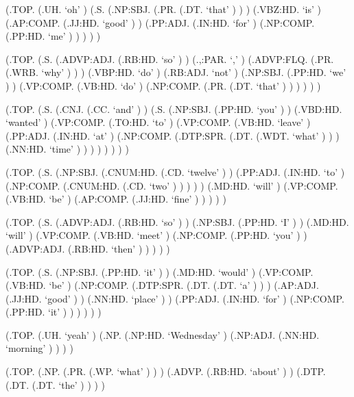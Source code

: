 \documentclass[10pt]{article}
\begin{document}
\begin{parsetree}  (.TOP. (.UH. `oh' ) (.S. (.NP:SBJ. (.PR. (.DT. `that' ) ) ) (.VBZ:HD. `is' ) (.AP:COMP. (.JJ:HD. `good' ) ) (.PP:ADJ. (.IN:HD. `for' ) (.NP:COMP. (.PP:HD. `me' ) ) ) ) ) \end{parsetree}

\begin{parsetree}  (.TOP. (.S. (.ADVP:ADJ. (.RB:HD. `so' ) ) (.,:PAR. `,' ) (.ADVP:FLQ. (.PR. (.WRB. `why' ) ) ) (.VBP:HD. `do' ) (.RB:ADJ. `not' ) (.NP:SBJ. (.PP:HD. `we' ) ) (.VP:COMP. (.VB:HD. `do' ) (.NP:COMP. (.PR. (.DT. `that' ) ) ) ) ) ) \end{parsetree}

\begin{parsetree}  (.TOP. (.S. (.CNJ. (.CC. `and' ) ) (.S. (.NP:SBJ. (.PP:HD. `you' ) ) (.VBD:HD. `wanted' ) (.VP:COMP. (.TO:HD. `to' ) (.VP:COMP. (.VB:HD. `leave' ) (.PP:ADJ. (.IN:HD. `at' ) (.NP:COMP. (.DTP:SPR. (.DT. (.WDT. `what' ) ) ) (.NN:HD. `time' ) ) ) ) ) ) ) ) \end{parsetree}

\begin{parsetree}  (.TOP. (.S. (.NP:SBJ. (.CNUM:HD. (.CD. `twelve' ) ) (.PP:ADJ. (.IN:HD. `to' ) (.NP:COMP. (.CNUM:HD. (.CD. `two' ) ) ) ) ) (.MD:HD. `will' ) (.VP:COMP. (.VB:HD. `be' ) (.AP:COMP. (.JJ:HD. `fine' ) ) ) ) ) \end{parsetree}

\begin{parsetree}  (.TOP. (.S. (.ADVP:ADJ. (.RB:HD. `so' ) ) (.NP:SBJ. (.PP:HD. `I' ) ) (.MD:HD. `will' ) (.VP:COMP. (.VB:HD. `meet' ) (.NP:COMP. (.PP:HD. `you' ) ) (.ADVP:ADJ. (.RB:HD. `then' ) ) ) ) ) \end{parsetree}

\begin{parsetree}  (.TOP. (.S. (.NP:SBJ. (.PP:HD. `it' ) ) (.MD:HD. `would' ) (.VP:COMP. (.VB:HD. `be' ) (.NP:COMP. (.DTP:SPR. (.DT. (.DT. `a' ) ) ) (.AP:ADJ. (.JJ:HD. `good' ) ) (.NN:HD. `place' ) ) (.PP:ADJ. (.IN:HD. `for' ) (.NP:COMP. (.PP:HD. `it' ) ) ) ) ) ) \end{parsetree}

\begin{parsetree}  (.TOP. (.UH. `yeah' ) (.NP. (.NP:HD. `Wednesday' ) (.NP:ADJ. (.NN:HD. `morning' ) ) ) ) \end{parsetree}

\begin{parsetree}  (.TOP. (.NP. (.PR. (.WP. `what' ) ) ) (.ADVP. (.RB:HD. `about' ) ) (.DTP. (.DT. (.DT. `the' ) ) ) ) \end{parsetree}
\end{document}
